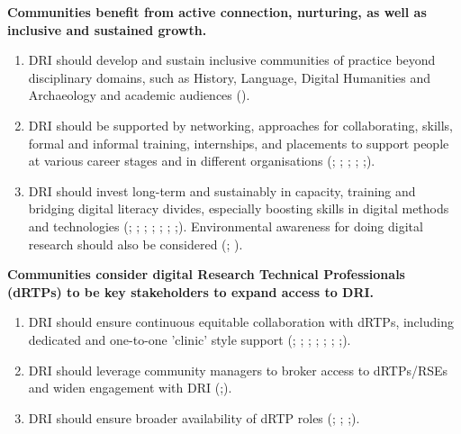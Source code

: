 \documentclass[11pt]{scrartcl}
\begin{document}
\noindent\textbf{Communities benefit from active connection, nurturing, as well as inclusive and sustained growth.}  

\begin{enumerate}[resume]
\item DRI should develop and sustain inclusive communities of practice beyond disciplinary domains, such as History, Language, Digital Humanities and Archaeology and academic audiences (\cite[10,26]{taylor_2022_10518740,beavan_2025a_15083396}).   

\item DRI should be supported by networking, approaches for collaborating, skills, formal and informal training, internships, and placements to support people at various career stages and in different organisations 
(\cite[17,72]{de_roure_2022_4716148}; \cite[2]{bell_2025_17099176}; \cite[20,21]{romanova_2021_5105938}; \cite[34,35]{shoaib_sufi_2023_7686348}; \cite[47]{taylor_2022_10518740};\cite{beavan_2025a_15083396}).   

\item DRI should invest long-term and sustainably in capacity, training and bridging digital literacy divides, especially boosting skills in digital methods and technologies 
(\cite[4,11]{de_roure_2022_4716148}; \cite[10]{Black19102024}; \cite[22]{collier25}; \cite[6]{evans23}; \cite[73]{shoaib_sufi_2023_7686348}; \cite[12,27]{sichani_2023_8177926}; \cite[7]{hawkins_2024_14006955};\cite{beavan_2025a_15083396}). 
Environmental awareness for doing digital research should also be considered 
(\cite[28]{sichani_2023_8177926}; \cite[6]{evans23}).  
\end{enumerate}

\noindent\textbf{Communities consider digital Research Technical Professionals (dRTPs) to be key stakeholders to expand access to DRI.}  

\begin{enumerate}[resume]
\item DRI should ensure continuous equitable collaboration with dRTPs, including dedicated and one-to-one 'clinic' style support 
(\cite[48]{de_roure_2022_4716148}; \cite[8]{bell_2025_17099176}; \cite[10]{Black19102024}; \cite[17]{romanova_2021_5105938}; \cite[12]{sichani_2023_8177926}; \cite[33]{taylor_2022_10518740}; \cite[1,2]{hawkins_2024_14006955};\cite{beavan_2025a_15083396}).

\item DRI should leverage community managers to broker access to dRTPs/RSEs and widen engagement with DRI 
(\cite[10]{bell_2025_17099176};\cite{beavan_2025a_15083396}).

\item DRI should ensure broader availability of dRTP roles 
(\cite[2]{bell_2025_17099176}; \cite[48,73]{shoaib_sufi_2023_7686348}; \cite[10]{sichani_2023_8177926};\cite{beavan_2025a_15083396}).  
\end{enumerate}
\end{document}
